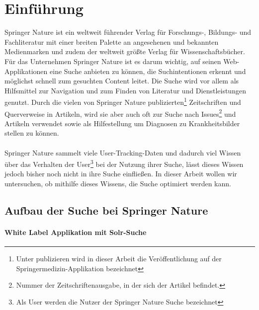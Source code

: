 %
\chapter{Einführung}
\label{sec:Einfuehrung}

Springer Nature ist ein weltweit führender Verlag für Forschungs-, Bildungs- und Fachliteratur mit einer breiten Palette an angesehenen und bekannten Medienmarken und zudem der weltweit größte Verlag für Wissenschaftsbücher. Für das Unternehmen Springer Nature ist es darum wichtig, auf seinen Web-Applikationen eine Suche anbieten zu können, die Suchintentionen erkennt und möglichst schnell zum gesuchten Content leitet. Die Suche wird vor allem als Hilfsmittel zur Navigation und zum Finden von Literatur und Dienstleistungen genutzt. Durch die vielen von Springer Nature publizierten\footnote{Unter publizieren wird in dieser Arbeit die Veröffentlichung auf der Springermedizin-Applikation bezeichnet} Zeitschriften und Querverweise in Artikeln, wird sie aber auch oft zur Suche nach Issues\footnote{Nummer der Zeitschriftenausgabe, in der sich der Artikel befindet.} und Artikeln verwendet sowie als Hilfestellung um Diagnosen zu Krankheitsbilder stellen zu können.
\\
\\
Springer Nature sammelt viele User-Tracking-Daten und dadurch viel Wissen über das Verhalten der User\footnote{Als User werden die Nutzer der Springer Nature Suche bezeichnet} bei der Nutzung ihrer Suche, lässt dieses Wissen jedoch bisher noch nicht in ihre Suche einfließen. In dieser Arbeit wollen wir untersuchen, ob mithilfe dieses Wissens, die Suche optimiert werden kann.


\section{Aufbau der Suche bei Springer Nature}
\label{sec:Einfuehrung:AufbauSucheBeiSpringerNature}

\subsubsection{White Label Applikation mit Solr-Suche}
\label{sec:Einfuehrung:AufbauSucheBeiSpringerNature:WhiteLabelApplikationSolr-Suche}

